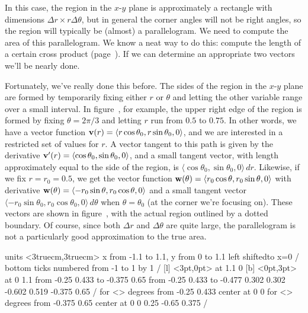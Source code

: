 In this case, the region in the $x$-$y$ plane is approximately a
rectangle with dimensions $\Delta r\times r\Delta\theta$, but in
general the corner angles will not be right angles, so the region will
typically be (almost) a parallelogram. We need to compute the area of
this parallelogram. We know
a neat way to do this: compute the length of a certain cross product
(page~). If we can determine an
appropriate two vectors we'll be nearly done.

Fortunately, we've really done this before. The sides of the region in
the $x$-$y$ plane are formed by temporarily fixing either $r$ or
$\theta$ and letting the other variable range over a small interval.
In figure~, for example, the upper right
edge of the region is formed by fixing $\theta=2\pi/3$ and letting $r$
run from $0.5$ to $0.75$. In other words, we have a vector function
${\bf v}(r)=\langle r\cos\theta_0, r\sin\theta_0, 0\rangle$, and we
are interested in a restricted set of values for $r$. A vector tangent
to this path is given by the derivative ${\bf v}'(r)=\langle
\cos\theta_0, \sin\theta_0, 0\rangle$, and a small tangent vector,
with length approximately equal to the side of the region, is $\langle
\cos\theta_0, \sin\theta_0, 0\rangle\,dr$. Likewise, if we fix
$r=r_0=0.5$, we get the vector function ${\bf w}(\theta)=\langle
r_0\cos\theta, r_0\sin\theta, 0\rangle$ with derivative ${\bf
  w}(\theta)=\langle -r_0\sin\theta, r_0\cos\theta, 0\rangle$ and a
small tangent vector $\langle -r_0\sin\theta_0, r_0\cos\theta_0,
0\rangle\,d\theta$ when $\theta=\theta_0$ (at the corner we're
focusing on). These vectors are shown in 
figure~, with the actual
region outlined by a dotted boundary. Of course, since both $\Delta r$
and $\Delta\theta$ are quite large, the parallelogram is not a
particularly good approximation to the true area.

\figure
\vbox{\beginpicture
\normalgraphs
\ninepoint
\setcoordinatesystem units <3truecm,3truecm> 
\setplotarea x from -1.1 to 1.1, y from 0 to 1.1
\axis left shiftedto x=0 /
\axis bottom  ticks numbered from -1 to 1 by 1 /
 [l] <3pt,0pt> at 1.1 0
 [b] <0pt,3pt> at 0 1.1
\arrow <5pt> [0.17, 0.5] from  -0.25 0.433  to  -0.375 0.65
\arrow <5pt> [0.17, 0.5] from -0.25 0.433 to -0.477  0.302
\setdashes
{}  0.302 -0.602 0.519 -0.375 0.65 /
\setdotsnear <2pt> for <\totalarclength>
 degrees from -0.25 0.433 center at 0 0
\setdotsnear <2pt> for <\totalarclength>
 degrees from -0.375 0.65 center at 0 0
\setlinear
{} 0.25 -0.65 0.375 /
\endpicture}

